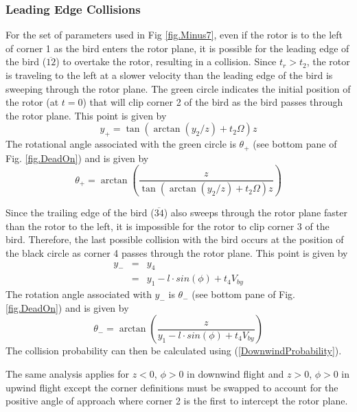 \label{} \documentclass[10pt,conference]{IEEEtran}
\begin{document}
\subsubsection{Leading Edge Collisions}
For the set of parameters used in Fig \ref{fig.Minus7}, even if the rotor is to the left of corner 1 as the bird enters
the rotor plane, it is possible for the leading edge of the bird ($\overline{12}$) to overtake the rotor, resulting in
a collision. Since $t_r>t_2$, the rotor is traveling to the left at a slower velocity than the leading edge of the bird
is sweeping through the rotor plane. The green circle indicates the initial position of the rotor (at $t=0$) that will
clip corner 2 of the bird as the bird passes through the rotor plane. This point is given by
\begin{equation}
    y_+ = \tan(\arctan(y_2/z)+t_2\Omega)z
\end{equation}
The rotational angle associated with the green circle is $\theta_+$ (see bottom pane of Fig. \ref{fig.DeadOn}) and is
given by
\begin{equation}
    \theta_+ = \arctan\left(\frac{z}{\tan(\arctan(y_2/z)+t_2\Omega)z}\right)
\end{equation}

Since the trailing edge of the bird ($\overline{34}$) also sweeps through the rotor plane faster than the rotor to the
left, it is impossible for the rotor to clip corner 3 of the bird. Therefore, the last possible collision with the bird
occurs at the position of the black circle as corner 4 passes through the rotor plane. This point is given by
\begin{eqnarray}
    \nonumber y_- &=& y_4\\
    &=& y_1-l \cdot sin(\phi) + t_4V_{by}
\end{eqnarray}
The rotation angle associated with $y_-$ is $\theta_-$ (see bottom pane of Fig. \ref{fig.DeadOn}) and is given by
\begin{equation}
    \theta_- = \arctan\left(\frac{z}{y_1-l \cdot sin(\phi) + t_4V_{by}}\right)
\end{equation}
The collision probability can then be calculated using (\ref{DownwindProbability}).

The same analysis applies for $z<0$, $\phi>0$ in downwind flight and $z>0$, $\phi>0$ in upwind flight except the corner
definitions must be swapped to account for the positive angle of approach where corner 2 is the first to intercept the
rotor plane.
\end{document}
